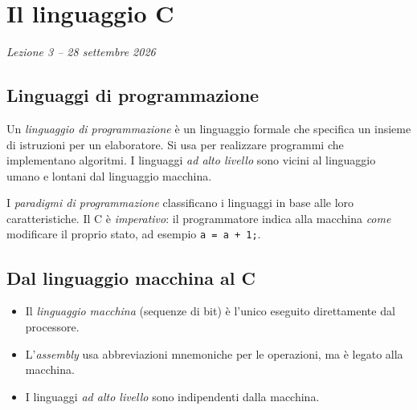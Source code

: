 \documentclass[11pt,a4paper]{article}
\begin{document}
\begin{center}
\end{center}

\section[Il linguaggio C (Lezione 3 -- 28 settembre 2026)]{Il linguaggio C}
\noindent\emph{Lezione 3 -- 28 settembre 2026}
\subsection{Linguaggi di programmazione}

\begin{definizione}
Un \emph{linguaggio di programmazione} è un linguaggio formale che specifica un
insieme di istruzioni per un elaboratore. Si usa per realizzare programmi che
implementano algoritmi. I linguaggi \emph{ad alto livello} sono vicini al
linguaggio umano e lontani dal linguaggio macchina.
\end{definizione}

I \emph{paradigmi di programmazione} classificano i linguaggi in base alle loro
caratteristiche. Il C è \emph{imperativo}: il programmatore indica alla
macchina \emph{come} modificare il proprio stato, ad esempio
\lstinline|a = a + 1;|.

\subsection{Dal linguaggio macchina al C}

\begin{itemize}
    \item Il \emph{linguaggio macchina} (sequenze di bit) è l'unico eseguito
          direttamente dal processore.
    \item L'\emph{assembly} usa abbreviazioni mnemoniche per le operazioni,
          ma è legato alla macchina.
    \item I linguaggi \emph{ad alto livello} sono indipendenti dalla macchina.
\end{itemize}
\end{document}
